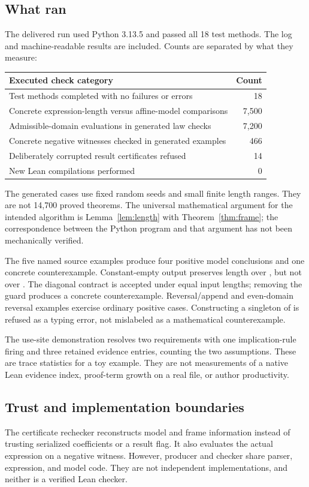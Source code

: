 \documentclass[11pt,letterpaper]{article}
\newcommand{\code}[1]{\texttt{\detokenize{#1}}}
\theoremstyle{definition}\newtheorem{definition}[theorem]{Definition}
\theoremstyle{remark}\newtheorem{remark}[theorem]{Remark}
\begin{document}
\subsection{What ran}
The delivered run used Python 3.13.5 and passed all 18 test methods. The log and
machine-readable results are included. Counts are separated by what they
measure:
\begin{center}\small
\begin{tabularx}{\textwidth}{@{}Y r@{}}
\toprule Executed check category & Count\\\midrule
Test methods completed with no failures or errors & 18\\
Concrete expression-length versus affine-model comparisons & 7,500\\
Admissible-domain evaluations in generated law checks & 7,200\\
Concrete negative witnesses checked in generated examples & 466\\
Deliberately corrupted result certificates refused & 14\\
New Lean compilations performed & 0\\
\bottomrule
\end{tabularx}
\end{center}
The generated cases use fixed random seeds and small finite length ranges.
They are not 14,700 proved theorems. The universal mathematical argument for
the intended algorithm is Lemma~\ref{lem:length} with
Theorem~\ref{thm:frame}; the correspondence between the Python program and that
argument has not been mechanically verified.

The five named source examples produce four positive model conclusions and
one concrete counterexample. Constant-empty output preserves length over
\code{List Empty}, but not over \code{List Nat}. The diagonal contract is
accepted under equal input lengths; removing the guard produces a concrete
counterexample. Reversal/append and even-domain reversal examples exercise
ordinary positive cases. Constructing a singleton of \code{Empty} is refused
as a typing error, not mislabeled as a mathematical counterexample.

The use-site demonstration resolves two requirements with one implication-rule
firing and three retained evidence entries, counting the two assumptions. These
are trace statistics for a toy example. They are not measurements of a native
Lean evidence index, proof-term growth on a real file, or author productivity.

\subsection{Trust and implementation boundaries}
The certificate rechecker reconstructs model and frame information instead of
trusting serialized coefficients or a result flag. It also evaluates the
actual expression on a negative witness. However, producer and checker share
parser, expression, and model code. They are not independent implementations,
and neither is a verified Lean checker.
\end{document}
